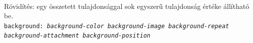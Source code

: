 \begin{frame}
  \begin{description}[m]
    \item[\texttt{background}] \hfill \\ Rövidítés: egy összetett 
    tulajdonsággal sok egyszerű tulajdonság értéke állítható 
    be. \\
    \texttt{background: \emph{background-color background-image 
    background-repeat}\\
    \qquad\emph{background-attachment background-position}}
  \end{description}
  \begin{columns}[T]
      \begin{exampleblock}{}
        \fontsize{7}{8} \selectfont
        
      \end{exampleblock}
      \begin{exampleblock}{}
        \fontsize{7}{8} \selectfont
        
      \end{exampleblock}
  \end{columns} 
\end{frame}

